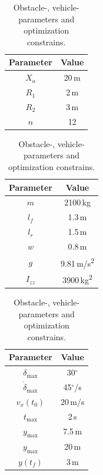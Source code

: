 \begin{table}[h!]
    \centering
    \begin{subtable}{0.3\textwidth}
        \begin{tabular}{c|c}
            Parameter & Value\\
            \hline
            $X_a$ & 20\,m\\
            $R_1$ & 2\,m\\
            $R_2$ & 3\,m\\
            $n$ & 12
        \end{tabular}
        \caption{Obstacle parameters}
        \label{tab:obst_pprty}
    \end{subtable}
    \begin{subtable}{0.3\textwidth}
        \begin{tabular}{c|c}
            Parameter & Value\\
            \hline
            $m$ & 2100\,kg\\
            $l_f$ & 1.3\,m\\
            $l_r$ & 1.5\,m\\
            $w$ & 0.8\,m\\
            $g$ & 9.81\,m/s\textsuperscript{2}\\
            $I_{zz}$ & 3900\,kg\textsuperscript{2}
        \end{tabular}
        \caption{Vehicle parameters}
        \label{tab:veh_pprty}
    \end{subtable}
    \begin{subtable}{0.3\textwidth}
        \begin{tabular}{c|c}
            Parameter & Value\\
            \hline
            $\delta_\text{max}$ & 30$^\circ$\\
            $\dot\delta_\text{max}$ & 45$^\circ$/s\\
            $v_x(t_0)$ & 20\,m/s\\
            $t_{\text{max}}$ & 2\,s\\
            $y_{\text{max}}$ & 7.5\,m\\
            $y_{\text{max}}$ & 20\,m\\
            $y(t_f)$ & 3\,m
        \end{tabular}
        \caption{Optimization constraints}
        \label{tab:const_pprty}
    \end{subtable}
    \caption{Obstacle-, vehicle-parameters and optimization constrains.}
\end{table}

